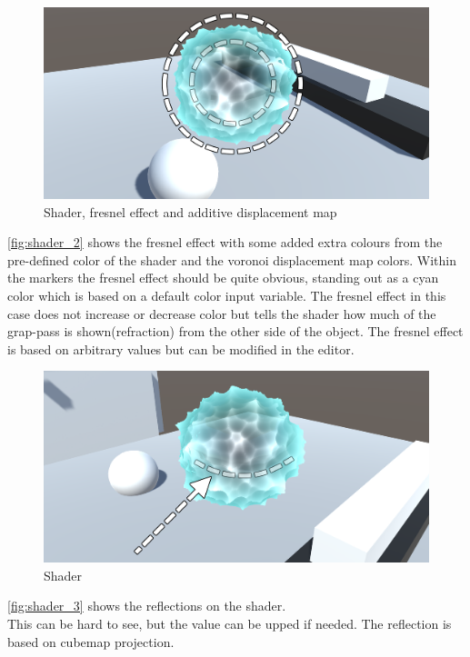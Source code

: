 \documentclass{article}
\begin{document}
\begin{figure}[H]
    \centering
    \includegraphics[width=\textwidth]{img/shader_2}
    \caption{Shader, fresnel effect and additive displacement map}
    \label{fig:shader_2}
\end{figure}
\autoref{fig:shader_2} shows the fresnel effect with some added extra colours from the pre-defined color of the shader and the voronoi displacement map colors. Within the markers the fresnel effect should be quite obvious, standing out as a cyan color which is based on a default color input variable. The fresnel effect in this case does not increase or decrease color but tells the shader how much of the grap-pass is shown(refraction) from the other side of the object. The fresnel effect is based on arbitrary values but can be modified in the editor. %

\begin{figure}[H]
    \centering
    \includegraphics[width=\textwidth]{img/shader_3}
    \caption{Shader}
    \label{fig:shader_3}
\end{figure}
\autoref{fig:shader_3} shows the reflections on the shader.\\This can be hard to see, but the value can be upped if needed. The reflection is based on cubemap projection.
\end{document}
